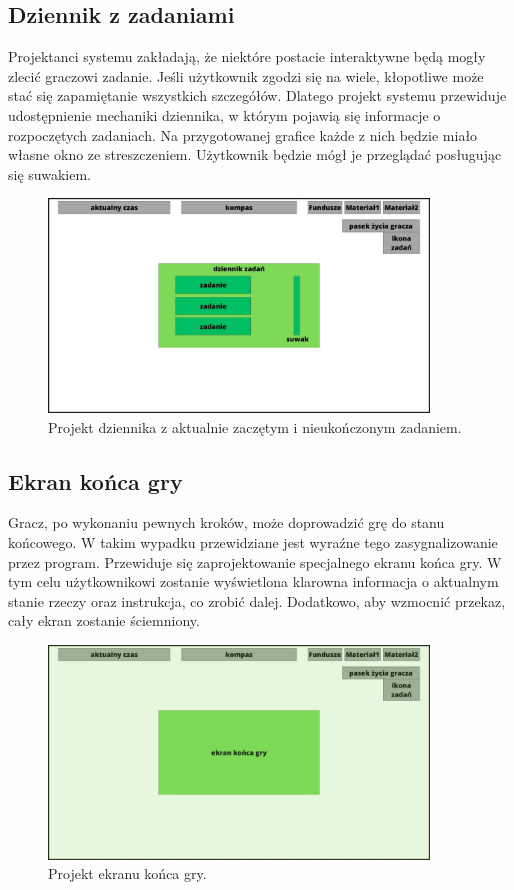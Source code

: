 \subsection{Dziennik z zadaniami}
Projektanci systemu zakładają, że niektóre postacie interaktywne będą mogły zlecić graczowi zadanie. Jeśli użytkownik zgodzi się na wiele,
kłopotliwe może stać się zapamiętanie wszystkich szczegółów. Dlatego projekt systemu przewiduje udostępnienie mechaniki dziennika, w którym 
pojawią się informacje o rozpoczętych zadaniach. Na przygotowanej grafice każde z nich będzie miało własne okno ze streszczeniem. Użytkownik 
będzie mógł je przeglądać posługując się suwakiem.
\begin{figure}[htbp]
    \centering
    \includegraphics[width=0.9\textwidth]{images/ui/ui_proj_dziennik_zadan.jpg}
    \caption{Projekt dziennika z aktualnie zaczętym i nieukończonym zadaniem.}\label{fig:end_sc}
\end{figure}

\subsection{Ekran końca gry}
Gracz, po wykonaniu pewnych kroków, może doprowadzić grę do stanu końcowego. W takim wypadku przewidziane jest wyraźne tego zasygnalizowanie przez program.
Przewiduje się zaprojektowanie specjalnego ekranu końca gry. W tym celu użytkownikowi zostanie wyświetlona klarowna informacja o aktualnym stanie rzeczy oraz instrukcja,
co zrobić dalej. Dodatkowo, aby wzmocnić przekaz, cały ekran zostanie ściemniony.
\begin{figure}[htbp]
    \centering
    \includegraphics[width=0.9\textwidth]{images/ui/ui_prooj_koniec_gry.jpg}
    \caption{Projekt ekranu końca gry.}\label{fig:end_sc}
\end{figure}
